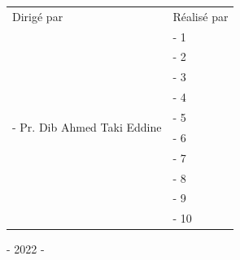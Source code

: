 \documentclass[french,11pt]{report}
\begin{document}
\begin{titlepage}
    \vspace{0.05\textheight}

    \begin{tabular}{l l}
        \Large Dirigé par                                        & \Large Réalisé par \\
        \multirow{10}{24em}{\large{- Pr. Dib Ahmed Taki Eddine}} & \large{- 1}        \\
                                                                 & \large{- 2}        \\
                                                                 & \large{- 3}        \\
                                                                 & \large{- 4}        \\
                                                                 & \large{- 5}        \\
                                                                 & \large{- 6}        \\
                                                                 & \large{- 7}        \\
                                                                 & \large{- 8}        \\
                                                                 & \large{- 9}        \\
                                                                 & \large{- 10}       \\
    \end{tabular}
    \vspace{4.3em}

    \centering
    - 2022 -
\end{titlepage}
\tableofcontents
\listoffigures
\listoftables

\pagebreak

\end{document}

